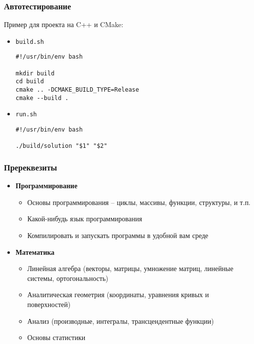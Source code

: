 \documentclass[10pt,handout]{beamer}
\begin{document}
\begin{frame}[fragile]
\frametitle{Автотестирование}
Пример для проекта на C++ и CMake:
\begin{itemize}
\item \texttt{build.sh}
\begin{verbatim}
#!/usr/bin/env bash

mkdir build
cd build
cmake .. -DCMAKE_BUILD_TYPE=Release
cmake --build .
\end{verbatim}
\item \texttt{run.sh}
\begin{verbatim}
#!/usr/bin/env bash

./build/solution "$1" "$2"
\end{verbatim}
\end{itemize}
\end{frame}

\begin{frame}
\frametitle{Пререквезиты}
\pause
\begin{itemize}
\item \textbf{Программирование}
\pause
\begin{itemize}
\item Основы программирования -- циклы, массивы, функции, структуры, и т.п.
\pause
\item Какой-нибудь язык программирования
\pause
\item Компилировать и запускать программы в удобной вам среде
\end{itemize}
\pause
\item \textbf{Математика}
\pause
\begin{itemize}
\item Линейная алгебра (векторы, матрицы, умножение матриц, линейные системы, ортогональность)
\pause
\item Аналитическая геометрия (координаты, уравнения кривых и поверхностей)
\pause
\item Анализ (производные, интегралы, трансцендентные функции)
\pause
\item Основы статистики
\end{itemize}
\end{itemize}
\end{frame}
\end{document}
